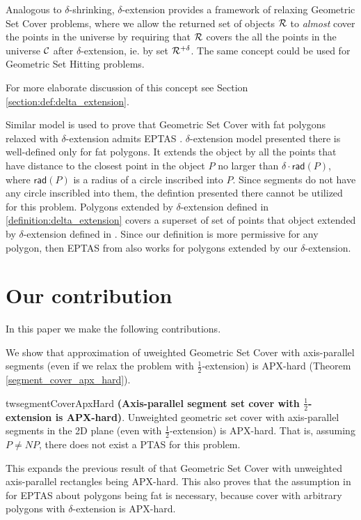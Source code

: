 Analogous to $\delta$-shrinking,
$\delta$-extension provides a framework of relaxing
Geometric Set Cover problems, where we allow the returned set of
objects $\mathcal{R}$ to \textit{almost} cover the points in the universe
by requiring that $\mathcal{R}$ covers the all the points in the universe
$\mathcal{C}$ after $\delta$-extension, ie. by set $\mathcal{R}^{+\delta}$.
The same concept could be used for Geometric Set Hitting problems.
 
For more elaborate discussion of this concept see Section
\ref{section:def:delta_extension}.

Similar model is used to prove that Geometric Set Cover with fat polygons
relaxed with $\delta$-extension admits EPTAS \cite{harpeled12}.
$\delta$-extension model presented there is well-defined only
for fat polygons. It extends the object by all the points that
have distance to the closest point in the object $P$
no larger than $\delta\cdot \mathsf{rad}(P)$, where $\mathsf{rad}(P)$
is a radius of a circle inscribed into $P$.
Since segments do not have any circle inscribled into them,
the defintion presented there cannot be utilized for this problem.
Polygons extended by $\delta$-extension
defined in \ref{definition:delta_extension}
covers a superset of set of points that object extended
by $\delta$-extension defined in \cite{harpeled12}.
Since our definition is more permissive for any polygon,
then EPTAS from \cite{harpeled12}
also works for polygons extended by our $\delta$-extension.

\section*{Our contribution}
In this paper we make the following contributions.

We show that approximation of uweighted Geometric Set Cover with axis-parallel segments
(even if we relax the problem with  $\frac{1}{2}$-extension) is APX-hard
(Theorem \ref{segment_cover_apx_hard}).

\begin{restatable}{tw}{segmentCoverApxHard}{
\label{segment_cover_apx_hard}
	\textbf{(Axis-parallel segment set cover with $\frac{1}{2}$-extension is APX-hard)}.	
	Unweighted geometric set cover
	with axis-parallel segments in the 2D plane
	(even with $\frac{1}{2}$-extension) is APX-hard.
	That is, assuming $P\neq NP$, there does not exist a PTAS
	for this problem.
}\end{restatable}

This expands the previous result of \cite{rectangles_apx_hard} 
that Geometric Set Cover
with unweighted axis-parallel rectangles being APX-hard.
This also proves that the assumption in \cite{harpeled12}
for EPTAS about polygons being fat is necessary, because
cover with arbitrary polygons with $\delta$-extension is APX-hard.


